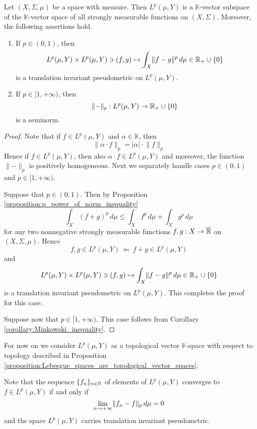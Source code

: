 \begin{proposition}\label{proposition:Lebesgue_spaces_are_topological_vector_spaces}
    Let $(X,\Sigma,\mu)$ be a space with measure. Then $L^p(\mu,Y)$ is a $\mathbb{K}$-vector subspace of the $\mathbb{K}$-vector space of all strongly measurable functions on $(X,\Sigma)$. Moreover, the following assertions hold.
    \begin{enumerate}[label=\emph{\textbf{(\arabic*)}}, leftmargin=*]
        \item If $p \in (0,1)$, then
              $$L^p(\mu,Y)\times L^p(\mu,Y) \ni (f,g) \mapsto \int_X\lVert f - g\rVert^p\,d\mu \in {\mathbb R}_+\cup \{0\}$$
              is a translation invariant pseudometric on $L^p(\mu,Y)$.
        \item If $p \in [1,+\infty)$, then
              $$\lVert-\rVert_p:L^p(\mu,Y)\rightarrow {\mathbb R}_+\cup \{0\}$$
              is a seminorm.
    \end{enumerate}
\end{proposition}
\begin{proof}
    Note that if $f\in L^p(\mu,Y)$ and $\alpha \in \mathbb{K}$, then
    $$\lVert \alpha \cdot f\rVert_p = |\alpha|\cdot \lVert f\rVert_p$$
    Hence if $f\in L^p(\mu,Y)$, then also $\alpha \cdot f \in L^p(\mu,Y)$ and moreover, the function $\lVert -\rVert_p$ is positively homogeneous. Next we separately handle cases $p \in (0,1)$ and $p \in [1,+\infty)$.

    Suppose that $p \in (0,1)$. Then by Proposition \ref{proposition:p_power_of_norm_inequality}
    $$\int_X\left(f + g\right)^p\,d\mu \leq \int_X f^p\,d\mu + \int_X g^p\,d\mu$$
    for any two nonnegative strongly measurable functions $f,g:X\rightarrow \overline{{\mathbb R}}$ on $(X,\Sigma,\mu)$. Hence
    $$f,g\in L^p(\mu,Y)\,\Leftarrow\,f+g\in L^p(\mu,Y)$$
    and
    $$L^p(\mu,Y)\times L^p(\mu,Y) \ni (f,g) \mapsto \int_X\lVert f - g\rVert^p\,d\mu \in {\mathbb R}_+\cup \{0\}$$
    is a translation invariant pseudometric on $L^p(\mu,Y)$. This completes the proof for this case.

    Suppose now that $p\in [1,+\infty)$. This case follows from Corollary \ref{corollary:Minkowski_inequality}.
\end{proof}
\noindent
For now on we consider $L^p(\mu,Y)$ as a topological vector $\mathbb{K}$-space with respect to topology described in Proposition \ref{proposition:Lebesgue_spaces_are_topological_vector_spaces}.

\begin{remark}\label{remark:topology_of_Lebesgue_spaces_is_sequential}
    Note that the sequence $\{f_n\}_{n\in {\mathbb N}}$ of elements of $L^p(\mu,Y)$ converges to $f\in L^p(\mu,Y)$ if and only if
    $$\lim_{n\rightarrow +\infty}\lVert f_n - f\rVert_p\,d\mu = 0$$
    and the space $L^p(\mu,Y)$ carries translation invariant pseudometric.
\end{remark}

